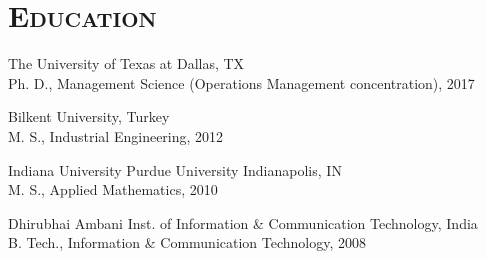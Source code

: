 \documentclass[11pt]{article}
\begin{document}
%


	\section*{\textsc{Education}}
	\begin{description}
			\item The University of Texas at Dallas,  TX\\ Ph. D., Management Science (Operations Management concentration), 2017
			\item  Bilkent University, Turkey \\ M. S., Industrial Engineering, 2012
			\item Indiana University Purdue University Indianapolis, IN\\  M. S., Applied Mathematics, 2010
			\item Dhirubhai Ambani Inst. of Information \& Communication Technology,  India\\  B. Tech.,  Information \& Communication Technology, 2008
	\end{description}
\end{document}
